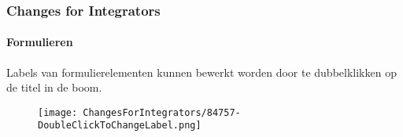 
\begin{frame}[fragile]
	\frametitle{Changes for Integrators}
	\framesubtitle{Formulieren}

	\lstset{basicstyle=\tiny\ttfamily}

	Labels van formulierelementen kunnen bewerkt worden door te dubbelklikken op de titel in de boom.

	\begin{figure}
		\texttt{[image: ChangesForIntegrators/84757-DoubleClickToChangeLabel.png]}
	\end{figure}

\end{frame}

